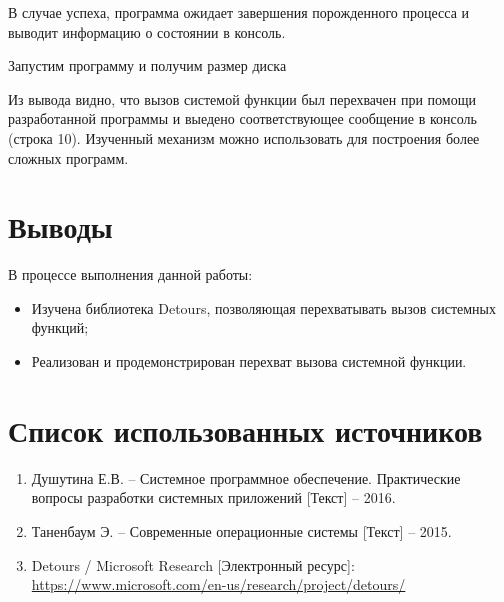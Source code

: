 

В случае успеха, программа ожидает завершения порожденного процесса и выводит информацию о состоянии в консоль.

Запустим программу и получим размер диска 



Из вывода видно, что вызов системой функции был перехвачен при помощи разработанной программы и выедено соответствующее сообщение в консоль (строка 10). Изученный механизм можно использовать для построения более сложных программ.

\section{Выводы}

В процессе выполнения данной работы:

\begin{itemize}
	\item Изучена библиотека Detours, позволяющая перехватывать вызов системных функций;
	\item Реализован и продемонстрирован перехват вызова системной функции.
\end{itemize}

\newpage

\section*{Список использованных источников}

\begin{enumerate}
	\item Душутина Е.В. -- Системное программное обеспечение. Практические вопросы разработки системных приложений [Текст] -- 2016.
	\item Таненбаум Э. -- Современные операционные системы [Текст] -- 2015.
	\item Detours / Microsoft Research [Электронный ресурс]:\\
		{\small\url{https://www.microsoft.com/en-us/research/project/detours/}}
\end{enumerate}


